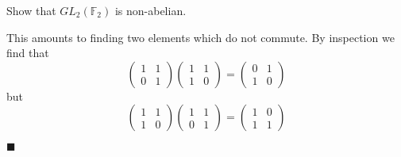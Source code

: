 \documentclass[12pt]{article}
\renewcommand{\qed}{\hfill$\blacksquare$}
\renewenvironment{proof}{\begin{addmargin}[1em]{0em}\begin{newproof}}{\end{newproof}\end{addmargin}\qed}
\newenvironment{problem}[2][Exercise]{\begin{trivlist}
\item[\hskip \labelsep {\bfseries #1}\hskip \labelsep {\bfseries #2.}]}{\end{trivlist}}
\begin{document}
\begin{problem}{1.4.3}
Show that $GL_2\left(\mathbb{F}_2\right)$ is non-abelian.
\end{problem}
\begin{proof}
This amounts to finding two elements which do not commute. By inspection we find that
$$ \left(\begin{array}{cc} 1 & 1 \\ 0 & 1 \end{array}\right)\left(\begin{array}{cc} 1 & 1 \\ 1 & 0 \end{array}\right) = \left(\begin{array}{cc} 0 & 1 \\ 1 & 0 \end{array}\right) $$ but
$$ \left(\begin{array}{cc} 1 & 1 \\ 1 & 0 \end{array}\right)\left(\begin{array}{cc}  1 & 1 \\ 0 &  1 \end{array}\right)=\left(\begin{array}{cc} 1 & 0 \\ 1 &  1 \end{array}\right)$$
\end{proof}
\end{document}
